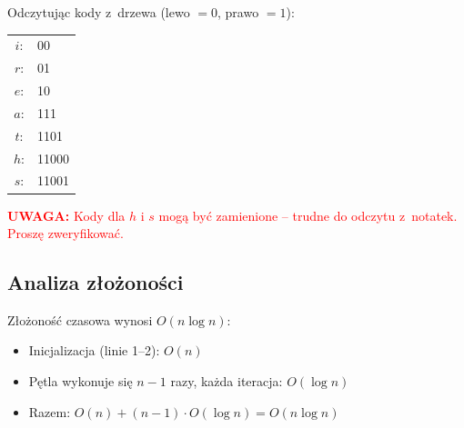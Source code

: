 \documentclass[a4paper,11pt]{article}
\theoremstyle{definition}
\begin{document}
\begin{center}
\end{center}

Odczytując kody z~drzewa (lewo $= 0$, prawo $= 1$):

\begin{center}
\begin{tabular}{cl}
    $i$: & 00 \\
    $r$: & 01 \\
    $e$: & 10 \\
    $a$: & 111 \\
    $t$: & 1101 \\
    $h$: & 11000 \\
    $s$: & 11001 \\
\end{tabular}
\end{center}

\textcolor{red}{\textbf{UWAGA:} Kody dla $h$ i $s$ mogą być zamienione -- trudne do odczytu z~notatek. Proszę zweryfikować.}

\subsection{Analiza złożoności}

Złożoność czasowa wynosi $O(n \log n)$:
\begin{itemize}
    \item Inicjalizacja (linie 1--2): $O(n)$
    \item Pętla wykonuje się $n - 1$ razy, każda iteracja: $O(\log n)$
    \item Razem: $O(n) + (n-1) \cdot O(\log n) = O(n \log n)$
\end{itemize}
\end{document}
